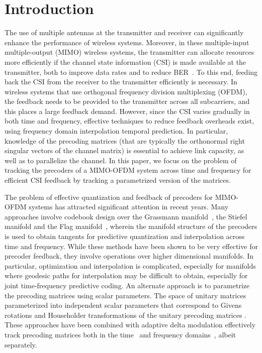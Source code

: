\documentclass[journal,10pt,twocolumn]{IEEEtran}
\begin{document}
\section{Introduction}
\label{intro}

The use of multiple antennas at the transmitter and receiver can
significantly enhance the performance of wireless systems. Moreover,
in these multiple-input multiple-output (MIMO) wireless systems, the
transmitter can allocate resources more efficiently if the channel
state information (CSI) is made available at the transmitter, both to
improve data rates and to reduce BER~\cite{love2008overview}. To this
end, feeding back the CSI from the receiver to the transmitter
efficiently is necessary. In wireless systems that use orthogonal
frequency division multiplexing (OFDM), the feedback needs to be
provided to the transmitter across all subcarriers, and this places a
large feedback demand. However, since the CSI varies gradually in both
time and frequency, effective techniques to reduce feedback overheads
exist, using frequency domain interpolation temporal prediction. In
particular, knowledge of the precoding matrices (that are typically
the orthonormal right singular vectors of the channel matrix) is
essential to achieve link capacity, as well as to parallelize the
channel. In this paper, we focus on the problem of tracking the
precoders of a MIMO-OFDM system across time and frequency for
efficient CSI feedback by tracking a parametrized version of the matrices.

The problem of effective quantization and feedback of precoders for
MIMO-OFDM systems has attracted significant attention in recent
years. Many approaches involve codebook design over the Grassmann
manifold~\cite{mondal2007quantization,schwarz2013adaptive,5946308},
the Stiefel manifold \cite{6891198,Gupt1905:Predictive} and the Flag
manifold~\cite{pitaval2013codebooks}, wherein the manifold structure
of the precoders is used to obtain tangents for predictive
quantization and interpolation across time and frequency. While these
methods have been shown to be very effective for precoder feedback,
they involve operations over higher dimensional manifolds. In
particular, optimization and interpolation is complicated, especially
for manifolds where geodesic paths for interpolation may be difficult
to obtain, especially for joint time-frequency predictive coding. An
alternate approach is to parametrize the precoding matrices using
scalar parameters. The space of unitary matrices parameterized into
independent scalar parameters that correspond to Givens rotations and
Householder transformations of the unitary precoding matrices
\cite{4114278,4556174}. These approaches have been combined with
adaptive delta modulation effectively track precoding matrices both in
the time~\cite{4114278} and frequency domains~\cite{4556174}, albeit
separately.
\end{document}
